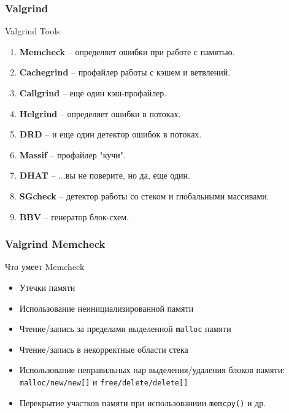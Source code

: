 \begin{frame}
	\frametitle{Valgrind}

	\begin{block}{Valgrind Tools}
		\begin{enumerate}
			\item {\bf Memcheck} -- определяет ошибки при работе с памятью.
			\item {\bf Cachegrind} -- профайлер работы с кэшем и ветвлений.
			\item {\bf Callgrind} -- еще один кэш-профайлер.
			\item {\bf Helgrind} -- определяет ошибки в потоках.
			\item {\bf DRD} -- и еще один детектор ошибок в потоках.
			\item {\bf Massif} -- профайлер "кучи".
			\item {\bf DHAT} -- ...вы не поверите, но да, еще один.
			\item {\bf SGcheck} -- детектор работы со стеком и глобальными массивами.
			\item {\bf BBV} -- генератор блок-схем.
		\end{enumerate}
	\end{block}
\end{frame}
	
\begin{frame}
	\frametitle{Valgrind Memcheck}

	\begin{block}{Что умеет Memcheck}
		\begin{itemize}
			\item Утечки памяти
			\item Использование неинициализированной памяти
			\item Чтение/запись за пределами выделенной {\tt malloc} памяти
			\item Чтение/запись в некорректные области стека
			\item Использование неправильных пар выделения/удаления блоков памяти:\\
				{\tt malloc/new/new[]} и {\tt free/delete/delete[]}
			\item Перекрытие участков памяти при использованиии {\tt memcpy()} и др.
		\end{itemize}
	\end{block}
\end{frame}


